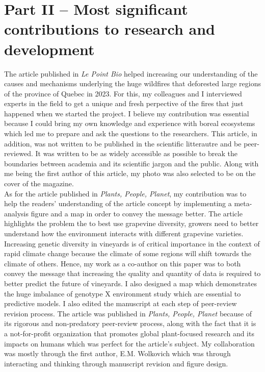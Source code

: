 \documentclass{article}
\begin{document}
\section*{Part II – Most significant contributions to research and development}
The article published in \textit{Le Point Bio} helped increasing our understanding of the causes and mechanisms underlying the huge wildfires that deforested large regions of the province of Quebec in 2023. For this, my colleagues and I interviewed experts in the field to get a unique and fresh perpective of the fires that just happened when we started the project. I believe my contribution was essential because I could bring my own knowledge and experience with boreal ecosystems which led me to prepare and ask the questions to the researchers. This article, in addition, was not written to be published in the scientific litterautre and be peer-reviewed. It was written to be as widely accessible as possible to break the boundaries between academia and its scientific jargon and the public. Along with me being the first author of this article, my photo was also selected to be on the cover of the magazine. \\

As for the article published in \textit{Plants, People, Planet}, my contribution was to help the readers' understanding of the article concept by implementing a meta-analysis figure and a map in order to convey the message better. The article highlights the problem the to best use grapevine diversity, growers need to better understand how the environment interacts with different grapevine varieties. Increasing genetic diversity in vineyards is of critical importance in the context of rapid climate change because the climate of some regions will shift towards the climate of others. Hence, my work as a co-author on this paper was to both convey the message that increasing the quality and quantity of data is required to better predict the future of vineyards. I also designed a map which demonstrates the huge imbalance of genotype X environment study which are essential to predictive models. I also edited the manuscript at each step of peer-review revision process. The article was published in \textit{Plants, People, Planet} because of its rigorous and non-predatory peer-review process, along with the fact that it is a not-for-profit organization that promotes global plant-focused research and its impacts on humans which was perfect for the article's subject. My collaboration was mostly through the first author, E.M. Wolkovich which was through interacting and thinking through manuscript revision and figure design. 
\end{document}
